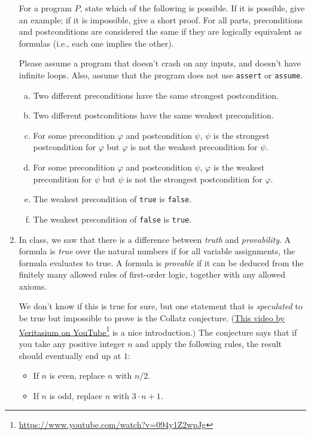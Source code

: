 \documentclass{article}
\newcommand{\visiblehref}[2]{\href{#1}{#2}\footnote{\url{#1}}}
\begin{document}
\begin{enumerate}
For a program $P$, state which of the following is possible.
If it is possible, give an example;
if it is impossible, give a short proof.
For all parts, preconditions and postconditions are considered the same if they are
logically equivalent as formulas (i.e., each one implies the other).

Please assume a program that doesn't crash on any inputs, and doesn't have infinite loops.
Also, assume that the program does not use \texttt{assert} or \texttt{assume}.

\begin{enumerate}[(a)]
\item
Two different preconditions have the same strongest postcondition.
\item
Two different postconditions have the same weakest precondition.
\item For some precondition $\varphi$ and postcondition $\psi$, $\psi$ is the strongest postcondition for $\varphi$ but $\varphi$ is not the weakest precondition for $\psi$.
\item For some precondition $\varphi$ and postcondition $\psi$,
$\varphi$ is the weakest precondition for $\psi$ but $\psi$ is not the strongest postcondition for $\varphi$.
\item
The weakest precondition of \texttt{true} is \texttt{false}.
\item
The weakest precondition of \texttt{false} is \texttt{true}.
\end{enumerate}

\item
In class, we saw that there is a difference between
\emph{truth} and \emph{provability}. A formula is \emph{true} over the natural numbers
if for all variable assignments, the formula evaluates to true.
A formula is \emph{provable} if it can be deduced from the finitely many allowed
rules of first-order logic, together with any allowed axioms.

We don't know if this is true for sure, but one statement that is \emph{speculated} to be true but impossible to prove is the Collatz conjecture.
(\visiblehref{https://www.youtube.com/watch?v=094y1Z2wpJg}{This video by Veritasium on YouTube} is a nice introduction.)
The conjecture says that if you take any positive integer $n$ and apply the following rules, the result should eventually end up at $1$:
\begin{itemize}
\item If $n$ is even, replace $n$ with $n / 2$.
\item If $n$ is odd, replace $n$ with $3 \cdot n + 1$.
\end{itemize}


\end{enumerate}
\end{document}
